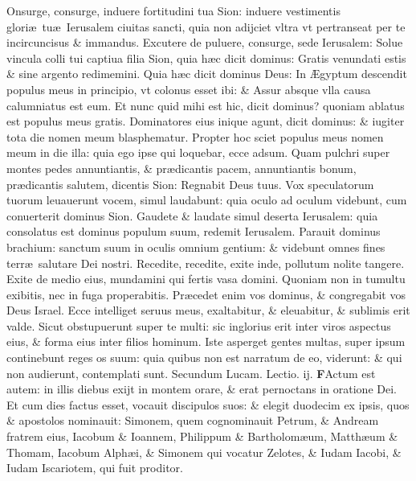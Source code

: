 \documentclass[a5paper,10pt]{book}
\def\leftmarginnote{%
	\lrmarginnote{\hskip -\marginparsep \hskip -6.5em}}
\def\rightmarginnote{%
	\lrmarginnote{\hskip\columnwidth \hskip -1em}}
\def\ae{æ}
\def\AE{Æ}
\begin{document}
\begin{multicols*}{2}
\vspace{-.25em}
Onsurge,\leftmarginnote{\begin{flushright}c. 52.\end{flushright}} consurge, induere fortitudini tua Sion: induere vestimentis glori\ae \ tu\ae \ Ierusalem ciuitas sancti, quia non adijciet vltra vt pertranseat per te incircuncisus \& immandus.
Excutere de puluere, consurge, sede Ierusalem: Solue vincula colli tui captiua filia Sion, quia h\ae c dicit dominus: Gratis venundati estis \& sine argento redimemini.
Quia h\ae c dicit dominus Deus: In \AE gyptum descendit populus meus in principio, vt colonus esset ibi: \& Assur absque vlla causa calumniatus est eum.
Et nunc quid mihi est hic, dicit dominus? quoniam ablatus est populus meus gratis.
Dominatores eius inique agunt, dicit dominus: \& iugiter tota die nomen meum blasphematur.
Propter hoc sciet populus meus nomen meum in die illa: quia ego ipse qui loquebar, ecce adsum.
Quam pulchri super montes pedes annuntiantis, \& pr\ae dicantis pacem, annuntiantis bonum, pr\ae dicantis salutem, dicentis Sion: Regnabit Deus tuus.
Vox speculatorum tuorum leuauerunt
vocem, simul laudabunt: quia oculo ad oculum videbunt, cum conuerterit dominus Sion.
Gaudete \& laudate simul deserta Ierusalem: quia consolatus est dominus populum suum, redemit Ierusalem.
Parauit dominus brachium: sanctum suum in oculis omnium gentium: \& videbunt omnes fines terr\ae \ salutare Dei nostri.
Recedite, recedite, exite inde, pollutum nolite tangere.
Exite de medio eius, mundamini qui fertis vasa domini.
Quoniam non in tumultu exibitis, nec in fuga properabitis.
Pr\ae cedet enim vos dominus, \& congregabit vos Deus Israel.
Ecce intelliget seruus meus, exaltabitur, \& eleuabitur, \& sublimis erit valde.
Sicut obstupuerunt super te multi: sic inglorius erit inter viros aspectus eius, \& forma eius inter filios hominum.
Iste asperget gentes multas, super ipsum continebunt reges os suum: quia quibus non est narratum de eo, viderunt: \& qui non audierunt, contemplati sunt.
\newline \color{red} Secundum Lucam. \hfill Lectio. ij. \color{black}
\vspace{-.25em}
\lettrine[lines=2]{\bfseries \color{red} F}{}Actum\rightmarginnote{ca. 6.} est autem: in illis diebus exijt in montem orare, \& erat pernoctans in oratione Dei.
Et cum dies factus esset, vocauit discipulos suos: \& elegit duodecim ex ipsis, quos \& apostolos nominauit: Simonem, quem cognominauit Petrum, \& Andream fratrem eius, Iacobum \& Ioannem, Philippum \& Bartholom\ae um, Matth\ae um \& Thomam, Iacobum Alph\ae i, \& Simonem qui vocatur Zelotes, \& Iudam Iacobi, \& Iudam Iscariotem, qui fuit proditor.

\end{multicols*}
\end{document}
